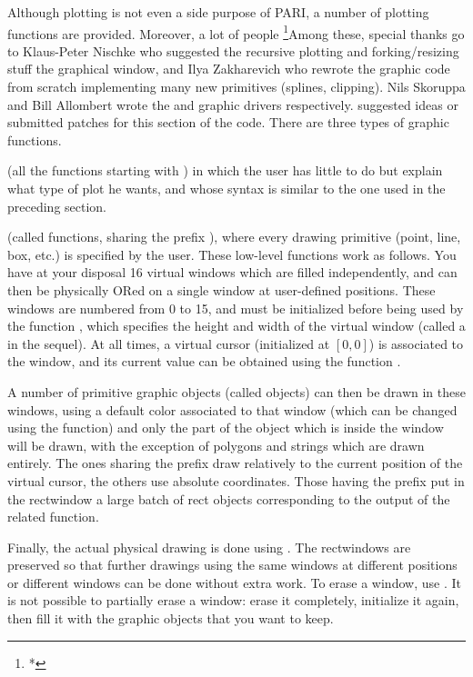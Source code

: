   Although plotting is not even a side purpose of PARI, a number of plotting
functions are provided. Moreover, a lot of people
\footnote{*}{Among these, special thanks go to Klaus-Peter Nischke who
suggested the recursive plotting and forking/resizing stuff the graphical
window, and Ilya Zakharevich who rewrote the graphic code from scratch
implementing many new primitives (splines, clipping). Nils Skoruppa and Bill
Allombert wrote the  and  graphic drivers respectively.}
suggested ideas or submitted patches for this section of the code. There are
three types of graphic functions.

 (all the functions starting with
) in which the user has little to do but explain what type of plot
he wants, and whose syntax is similar to the one used in the preceding
section.

 (called  functions,
sharing the prefix ), where every drawing primitive (point, line,
box, etc.) is specified by the user. These low-level functions work as
follows. You have at your disposal 16 virtual windows which are filled
independently, and can then be physically ORed on a single window at
user-defined positions. These windows are numbered from 0 to 15, and must be
initialized before being used by the function , which specifies
the height and width of the virtual window (called a  in the
sequel). At all times, a virtual cursor (initialized at $[0,0]$) is associated
to the window, and its current value can be obtained using the function
.

A number of primitive graphic objects (called  objects) can then
be drawn in these windows, using a default color associated to that window
(which can be changed using the  function) and only the part
of the object which is inside the window will be drawn, with the exception of
polygons and strings which are drawn entirely. The ones sharing the prefix
 draw relatively to the current position of the virtual cursor,
the others use absolute coordinates. Those having the prefix 
put in the rectwindow a large batch of rect objects corresponding to the
output of the related  function.

   Finally, the actual physical drawing is done using . The
rectwindows are preserved so that further drawings using the same windows at
different positions or different windows can be done without extra work. To
erase a window, use . It is not possible to partially erase a
window: erase it completely, initialize it again, then fill it with the
graphic objects that you want to keep.

